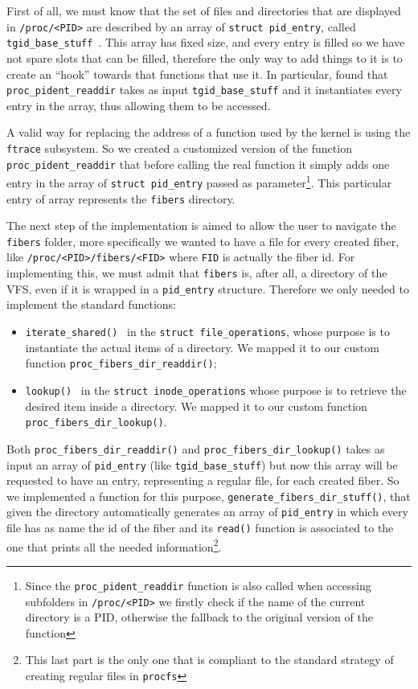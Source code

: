 \documentclass[a4paper,10pt]{article}
\begin{document}
First of all, we must know that the set of files and directories that are displayed in \lstinline{/proc/<PID>} are described by an array of \lstinline{struct pid_entry}, called \lstinline{tgid_base_stuff}~\cite{kern_tgid_base_stuff}. This array has fixed size, and every entry is filled so we have not spare slots that can be filled, therefore the only way to add things to it is to create an ``hook'' towards that functions that use it. In particular, found that \lstinline{proc_pident_readdir} takes as input \lstinline{tgid_base_stuff} and it instantiates every entry in the array, thus allowing them to be accessed.

A valid way for replacing the address of a function used by the kernel is using the \lstinline{ftrace} subsystem. So we created a customized version of the function \lstinline{proc_pident_readdir} that before calling the real function it simply adds one entry in the array of \lstinline{struct pid_entry} passed as parameter\footnote{Since the \lstinline{proc_pident_readdir} function is also called when accessing subfolders in \lstinline{/proc/<PID>} we firstly check if the name of the current directory is a PID, otherwise the fallback to the original version of the function}. This particular entry of array represents the \texttt{fibers} directory.

The next step of the implementation is aimed to allow the user to navigate the \texttt{fibers} folder, more specifically we wanted to have a file for every created fiber, like \lstinline{/proc/<PID>/fibers/<FID>} where \texttt{FID} is actually the fiber id. For implementing this, we must admit that \texttt{fibers} is, after all, a directory of the VFS, even if it is wrapped in a \lstinline{pid_entry} structure. Therefore we only needed to implement the standard functions:
\begin{itemize}
	\item \lstinline{iterate_shared()}~\cite{kern_file_ops_iterate} in the \lstinline{struct file_operations}, whose purpose is to instantiate the actual items of a directory. We mapped it to our custom function \lstinline{proc_fibers_dir_readdir()};
	\item \lstinline{lookup()}~\cite{kern_inode_ops_lookup} in the \lstinline{struct inode_operations} whose purpose is to retrieve the desired item inside a directory. We mapped it to our custom function \lstinline{proc_fibers_dir_lookup()}.
\end{itemize}
Both \lstinline{proc_fibers_dir_readdir()} and \lstinline{proc_fibers_dir_lookup()} takes as input an array of \lstinline{pid_entry} (like \lstinline{tgid_base_stuff}) but now this array will be requested to have an entry, representing a regular file, for each created fiber. So we implemented a function for this purpose, \lstinline{generate_fibers_dir_stuff()}, that given the directory automatically generates an array of \lstinline{pid_entry} in which every file has as name the id of the fiber and its \lstinline{read()} function is associated to the one that prints all the needed information\footnote{This last part is the only one that is compliant to the standard strategy of creating regular files in \texttt{procfs}}.
\end{document}
